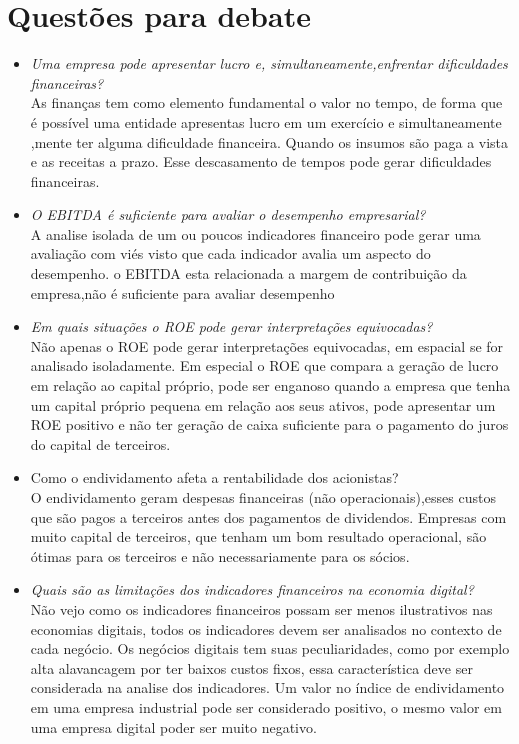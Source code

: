\section{Questões para debate}
\begin{itemize}
\item \textit{Uma empresa pode apresentar lucro e, simultaneamente,enfrentar dificuldades financeiras?}\\
  As finanças tem como elemento fundamental o valor no tempo, de forma que é possível uma entidade apresentas lucro em um exercício e simultaneamente ,mente ter alguma dificuldade financeira. Quando os insumos são paga a vista e as receitas a prazo. Esse descasamento de tempos pode gerar dificuldades financeiras.
\item \textit{O EBITDA é suficiente para avaliar o desempenho empresarial?}\\
A analise isolada de um ou poucos indicadores financeiro pode gerar uma avaliação com viés visto que cada indicador avalia um aspecto do desempenho. o EBITDA esta relacionada a margem de contribuição da empresa,não é suficiente para avaliar  desempenho\\
\item \textit{Em quais situações o ROE pode gerar interpretações equivocadas?}\\
Não apenas o ROE pode gerar interpretações equivocadas, em espacial se for analisado isoladamente. Em especial o ROE que compara a geração de lucro em relação ao capital próprio, pode ser enganoso quando a empresa que tenha um capital próprio pequena em relação aos seus ativos, pode apresentar um ROE positivo e não ter geração de caixa suficiente para o pagamento do juros do capital de terceiros.
\item {Como o endividamento afeta a rentabilidade dos acionistas?}\\
O endividamento geram despesas financeiras (não operacionais),esses custos que são pagos a terceiros antes dos pagamentos de dividendos. Empresas com muito capital de terceiros, que tenham um bom resultado operacional, são ótimas para os terceiros e não necessariamente para os sócios.
\item \textit{Quais são as limitações dos indicadores financeiros na economia digital?}\\
  Não vejo como os indicadores financeiros possam ser menos ilustrativos nas economias digitais, todos os indicadores devem ser analisados no contexto de cada negócio. Os negócios digitais tem suas peculiaridades, como por exemplo alta alavancagem por ter baixos custos fixos, essa característica deve ser considerada na analise dos indicadores. Um valor no índice de endividamento em uma empresa industrial pode ser considerado positivo, o mesmo valor em uma empresa digital poder ser muito negativo.
 \end{itemize}

